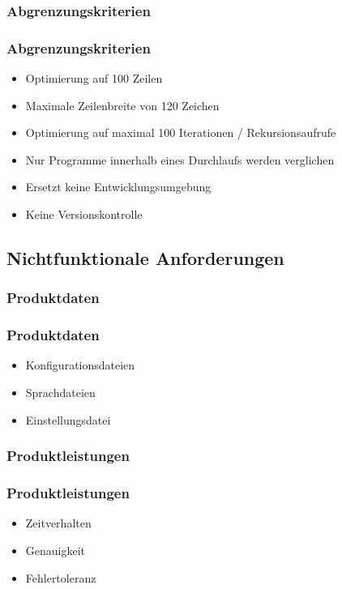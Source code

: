 \documentclass{beamer}
\begin{document}
\subsubsection{Abgrenzungskriterien}
\begin{frame}
\frametitle{Abgrenzungskriterien}
\begin{itemize}
\item Optimierung auf 100 Zeilen
\item Maximale Zeilenbreite von 120 Zeichen
\item Optimierung auf maximal 100 Iterationen / Rekursionsaufrufe
\item Nur Programme innerhalb eines Durchlaufs werden verglichen
\item Ersetzt keine Entwicklungsumgebung
\item Keine Versionskontrolle
\end{itemize}
\end{frame}


\subsection{Nichtfunktionale Anforderungen}
\subsubsection{Produktdaten}
\begin{frame}
\frametitle{Produktdaten}
\begin{itemize}
\item Konfigurationsdateien
\item Sprachdateien
\item Einstellungsdatei
\end{itemize}
\end{frame}
\subsubsection{Produktleistungen}
\begin{frame}
\frametitle{Produktleistungen}
\begin{itemize}
\item Zeitverhalten
\item Genauigkeit
\item Fehlertoleranz
\end{itemize}
\end{frame}
\end{document}

